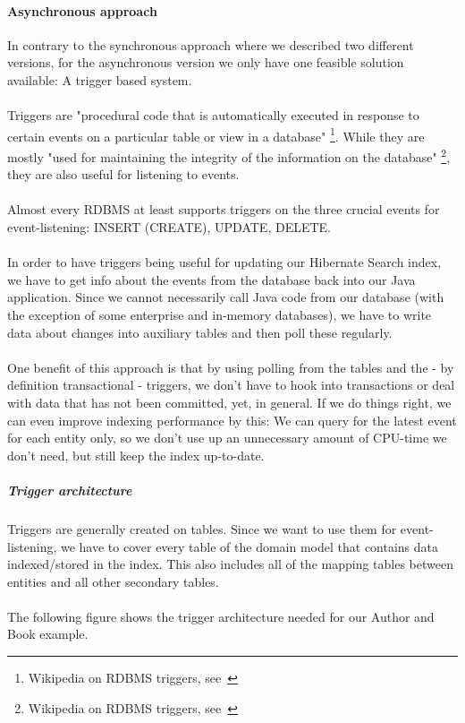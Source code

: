 \paragraph{Asynchronous approach}
In contrary to the synchronous approach where we described two different versions, for the asynchronous version we only have one feasible solution available: A trigger based system.
\\\\
Triggers are "procedural code that is automatically executed in response to certain events on a particular table or view in a database" \footnote{Wikipedia on RDBMS triggers, see~\cite{triggers_wiki}}. While they are mostly "used for maintaining the integrity of the information on the database" \footnote{Wikipedia on RDBMS triggers, see~\cite{triggers_wiki}}, they are also useful for listening to events.
\\\\
Almost every RDBMS at least supports triggers on the three crucial events for event-listening: INSERT (CREATE), UPDATE, DELETE.
\\\\
In order to have triggers being useful for updating our Hibernate Search index, we have to get info about the events from the database back into our Java application. Since we cannot necessarily call Java code from our database (with the exception of some enterprise and in-memory databases), we have to write data about changes into auxiliary tables and then poll these regularly.
\\\\
One benefit of this approach is that by using polling from the tables and the - by definition transactional - triggers, we don't have to hook into transactions or deal with data that has not been committed, yet, in general. If we do things right, we can even improve indexing performance by this: We can query for the latest event for each entity only, so we don't use up an unnecessary amount of CPU-time we don't need, but still keep the index up-to-date.

\subparagraph{Trigger architecture}

Triggers are generally created on tables. Since we want to use them for event-listening, we have to cover every table of the domain model that contains data indexed/stored in the index. This also includes all of the mapping tables between entities and all other secondary tables.
\\\\
The following figure shows the trigger architecture needed for our Author and Book example.

